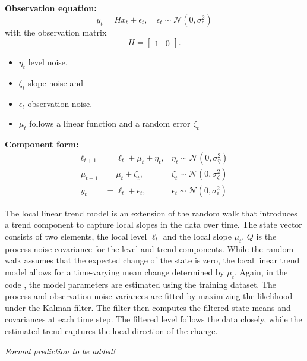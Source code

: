 \medskip
\noindent     
\textbf{Observation equation:}
\[
y_t = Hx_t+\epsilon_t, \quad \epsilon_t \sim \mathcal{N}(0, \sigma^2_\epsilon)
\]
with the observation matrix \[H=\begin{bmatrix} 1 & 0 \end{bmatrix}.\]
\begin{itemize}
    \item $\eta_t$ level noise, 
    \item $\zeta_t$ slope noise and
    \item $\epsilon_t$ observation noise. 
    \item $\mu_t$ follows a linear function and a random error $\zeta_t$
\end{itemize}

\medskip
\noindent 
\textbf{Component form:}
\begin{align*}
    \ell_{t+1} &= \ell_t + \mu_t + \eta_t, &\eta_t \sim \mathcal{N}(0, \sigma^2_\eta)\\
    \mu_{t+1} &= \mu_t + \zeta_t, &\zeta_t \sim \mathcal{N}(0, \sigma^2_\zeta)\\
    y_t &= \ell_t+\epsilon_t, &\epsilon_t \sim \mathcal{N}(0, \sigma^2_\epsilon)
\end{align*}


\medskip
The local linear trend model is an extension of the random walk that introduces a trend component to capture local slopes  in the data over time. The state vector consists of two elements, the local level $\ell_t$ and the local slope $\mu_t$. $Q$ is the process noise covariance for the level and trend components. While the random walk assumes that the expected change of the state is zero, the local linear trend model allows for a time-varying mean change determined by $\mu_t$. Again, in the code , the model parameters are estimated using the training dataset. The process and observation noise variances are fitted by maximizing the likelihood under the Kalman filter. The filter then computes the filtered state means and covariances at each time step. The filtered level follows the data closely, while the estimated trend captures the local direction of the change. 

\medskip
\noindent
\textit{Formal prediction to be added!}


